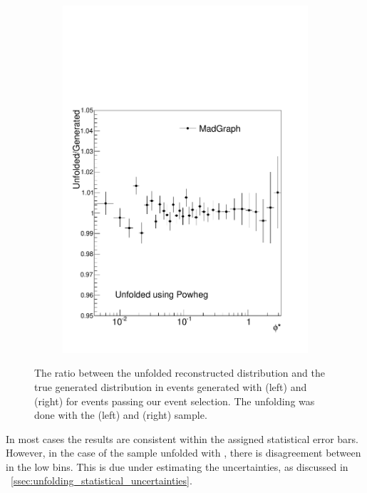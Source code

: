 \begin{figure}[!htbp]
\begin{subfigure}[b]{\SideBySidePlotWidth}
        \includegraphics[width=\textwidth]{figures/BinM_PM.pdf}
        \caption{}
        \label{fig:unfolding_madgraph_with_powheg}
    \end{subfigure}
    \caption{
        The ratio between the unfolded reconstructed \phistar distribution and
        the true generated \phistar distribution in \Ztoee events generated
        with \POWHEG (left) and \MADGRAPH (right) for events passing our event
        selection. The unfolding was done with the \MADGRAPH (left) and \POWHEG
        (right) sample.
    }
    \label{fig:cross_mc_unfolding}
\end{figure}

In most cases the results are consistent within the assigned statistical error
bars. However, in the case of the \MADGRAPH sample unfolded with \POWHEG, there
is disagreement between in the low \phistar bins. This is due \RooUnfold under
estimating the uncertainties, as discussed in
\SEC~\ref{ssec:unfolding_statistical_uncertainties}.

